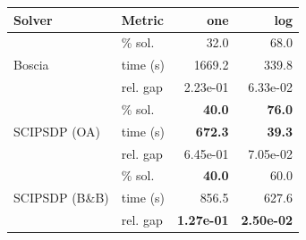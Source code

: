 \begin{tabular}{llrr}
\toprule
 Solver & Metric & one & log \\
\midrule
\multirow{3}{*}{Boscia} & \% sol. & 32.0 & 68.0 \\
  & time (s) & 1669.2 & 339.8 \\
  & rel. gap & 2.23e-01 & 6.33e-02 \\
\midrule
\multirow{3}{*}{SCIPSDP (OA)} & \% sol. & \textbf{40.0} & \textbf{76.0} \\
  & time (s) & \textbf{672.3} & \textbf{39.3} \\
  & rel. gap & 6.45e-01 & 7.05e-02 \\
\midrule
\multirow{3}{*}{SCIPSDP (B\&B)} & \% sol. & \textbf{40.0} & 60.0 \\
  & time (s) & 856.5 & 627.6 \\
  & rel. gap & \textbf{1.27e-01} & \textbf{2.50e-02} \\
\bottomrule
\end{tabular}
